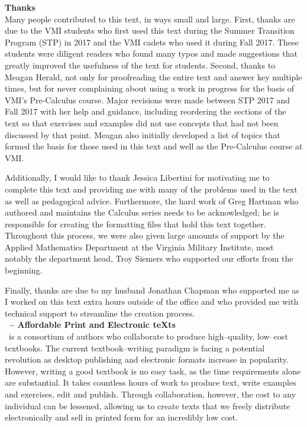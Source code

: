 \noindent\textbf{\large Thanks}\\

Many people contributed to this text, in ways small and large. First, thanks are due to the VMI students who first used this text during the Summer Transition Program (STP) in 2017 and the VMI cadets who used it during Fall 2017. These students were diligent readers who found many typos and made suggestions that greatly improved the usefulness of the text for students. Second, thanks to Meagan Herald, not only for proofreading the entire text and answer key multiple times, but for never complaining about using a work in progress for the basis of VMI's Pre-Calculus course. Major revisions were made between STP 2017 and Fall 2017 with her help and guidance, including reordering the sections of the text so that exercises and examples did not use concepts that had not been discussed by that point. Meagan also initially developed a list of topics that formed the basis for those used in this text and well as the Pre-Calculus course at VMI.

Additionally, I would like to thank Jessica Libertini for motivating me to complete this text and providing me with many of the problems used in the text as well as pedagogical advice. Furthermore, the hard work of Greg Hartman who authored and maintains the \apex Calculus series needs to be acknowledged; he is responsible for creating the formatting files that hold this text together. Throughout this process, we were also given large amounts of support by the Applied Mathematics Department at the Virginia Military Institute, most notably the department head, Troy Siemers who supported our efforts from the beginning.

Finally, thanks are due to my husband Jonathan Chapman who supported me as I worked on this text extra hours outside of the office and who provided me with technical support to streamline the creation process. \\

\noindent\textbf{\large \apex\  -- Affordable Print and Electronic teXts}\\

\apex\ is a consortium of authors  who collaborate to produce high--quality, low--cost textbooks. The current textbook--writing paradigm is facing a potential revolution as desktop publishing and electronic formats increase in popularity. However, writing a good textbook is no easy task, as the time requirements alone are substantial. It takes countless hours of work to produce text, write examples and exercises, edit and publish. Through collaboration, however, the cost to any individual can be lessened, allowing us to create texts that we freely distribute electronically and sell in printed form for an incredibly low cost. 

